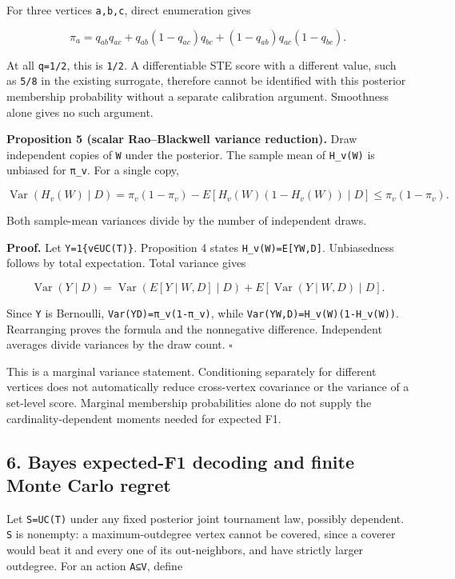 \documentclass[
  11pt,
]{article}
\begin{document}
For three vertices \texttt{a,b,c}, direct enumeration gives

\[
\pi_a=q_{ab}q_{ac}+q_{ab}(1-q_{ac})q_{bc}
+(1-q_{ab})q_{ac}(1-q_{bc}).
\]

At all \texttt{q=1/2}, this is \texttt{1/2}. A differentiable STE score
with a different value, such as \texttt{5/8} in the existing surrogate,
therefore cannot be identified with this posterior membership
probability without a separate calibration argument. Smoothness alone
gives no such argument.

\textbf{Proposition 5 (scalar Rao--Blackwell variance reduction).} Draw
independent copies of \texttt{W} under the posterior. The sample mean of
\texttt{H\_v(W)} is unbiased for \texttt{π\_v}. For a single copy,

\[
\operatorname{Var}(H_v(W)\mid D)
=\pi_v(1-\pi_v)-E[H_v(W)(1-H_v(W))\mid D]
\le\pi_v(1-\pi_v).
\]

Both sample-mean variances divide by the number of independent draws.

\textbf{Proof.} Let \texttt{Y=1\{v∈UC(T)\}}. Proposition 4 states
\texttt{H\_v(W)=E{[}Y\textbar{}W,D{]}}. Unbiasedness follows by total
expectation. Total variance gives

\[
\operatorname{Var}(Y\mid D)=\operatorname{Var}(E[Y\mid W,D]\mid D)
+E[\operatorname{Var}(Y\mid W,D)\mid D].
\]

Since \texttt{Y} is Bernoulli, \texttt{Var(Y\textbar{}D)=π\_v(1-π\_v)},
while \texttt{Var(Y\textbar{}W,D)=H\_v(W)(1-H\_v(W))}. Rearranging
proves the formula and the nonnegative difference. Independent averages
divide variances by the draw count. \(\square\)

This is a marginal variance statement. Conditioning separately for
different vertices does not automatically reduce cross-vertex covariance
or the variance of a set-level score. Marginal membership probabilities
alone do not supply the cardinality-dependent moments needed for
expected F1.

\hypertarget{bayes-expected-f1-decoding-and-finite-monte-carlo-regret}{%
\subsection{6. Bayes expected-F1 decoding and finite Monte Carlo
regret}\label{bayes-expected-f1-decoding-and-finite-monte-carlo-regret}}

Let \texttt{S=UC(T)} under any fixed posterior joint tournament law,
possibly dependent. \texttt{S} is nonempty: a maximum-outdegree vertex
cannot be covered, since a coverer would beat it and every one of its
out-neighbors, and have strictly larger outdegree. For an action
\texttt{A⊆V}, define
\end{document}
